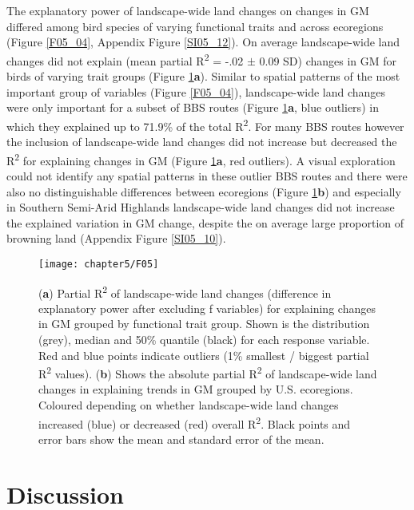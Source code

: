 The explanatory power of landscape-wide land changes on changes in GM differed among bird species of varying functional traits and across ecoregions (Figure \ref{F05_04}, Appendix Figure \ref{SI05_12}). On average landscape-wide land changes did not explain (mean partial R\textsuperscript{2} = -.02 $\pm$ 0.09 SD) changes in GM for birds of varying trait groups (Figure \ref{F05_05}\textbf{a}). Similar to spatial patterns of the most important group of variables (Figure \ref{F05_04}), landscape-wide land changes were only important for a subset of BBS routes (Figure \ref{F05_05}\textbf{a}, blue outliers) in which they explained up to 71.9\% of the total R\textsuperscript{2}. For many BBS routes however the inclusion of landscape-wide land changes did not increase but decreased the R\textsuperscript{2} for explaining changes in GM (Figure \ref{F05_05}\textbf{a}, red outliers). A visual exploration could not identify any spatial patterns in these outlier BBS routes and there were also no distinguishable differences between ecoregions (Figure \ref{F05_05}\textbf{b}) and especially in Southern Semi-Arid Highlands landscape-wide land changes did not increase the explained variation in GM change, despite the on average large proportion of browning land (Appendix Figure \ref{SI05_10}).

\begin{figure}[htb]
\centering
\texttt{[image: chapter5/F05]}
\caption{(\textbf{a}) Partial R\textsuperscript{2} of landscape-wide land changes (difference in explanatory power after excluding f variables) for explaining changes in GM grouped by functional trait group. Shown is the distribution (grey), median and 50\% quantile (black) for each response variable. Red and blue points indicate outliers (1\% smallest / biggest partial R\textsuperscript{2} values). (\textbf{b}) Shows the absolute partial R\textsuperscript{2} of landscape-wide land changes in explaining trends in GM grouped by U.S. ecoregions. Coloured depending on whether landscape-wide land changes increased (blue) or decreased (red) overall R\textsuperscript{2}. Black points and error bars show the mean and standard error of the mean.}
\label{F05_05}
\end{figure}

\section{Discussion}
\label{C05_04}

